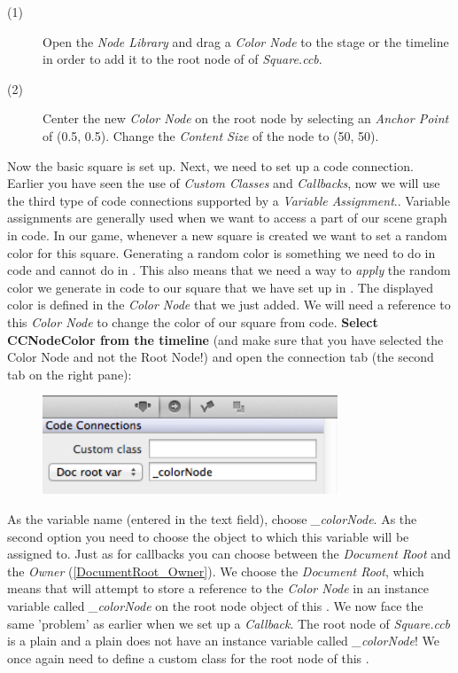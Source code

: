 \begin{description}
\item[(1)] Open the \textit{Node Library} and drag a \textit{Color Node} to the
stage or the timeline in order to add it to the root node of of
\textit{Square.ccb}.
\item[(2)] Center the new \textit{Color Node} on the root node by selecting an
\textit{Anchor Point} of (0.5, 0.5). Change the \textit{Content Size} of the
node to (50, 50).
\end{description}

Now the basic square is set up. Next, we need to set up a code connection. Earlier you have seen
the use of \textit{Custom Classes} and \textit{Callbacks}, now we will use the
third type of code connections supported by \SB{} a \textit{Variable
Assignment}.. Variable assignments
are generally used when we want to access a part of our scene graph in code. In
our game, whenever a new square is created we want to set a random color for
this square. Generating a random color is something we need to do in code and
cannot do in \SB{}. This also means that we need a way to \textit{apply} the random color we
generate in code to our square that we have set up in \SB{}. The displayed color
is defined in the \textit{Color Node} that we just added. We will need a
reference to this \textit{Color Node} to change the color of our square from
code. \textbf{Select CCNodeColor from the timeline} (and make sure that you
have selected the Color Node and not the Root Node!) and open the connection tab
(the second tab on the right pane):
\begin{figure}[H]
		\centering
		\includegraphics[width=250pt]{images/firstproject/square_code_connection.png}
\end{figure}
As the variable name (entered in the text field), choose \textit{\_colorNode}.
As the second option you need to choose the object to which this variable will be
assigned to. Just as for callbacks you can choose between the \textit{Document
Root} and the \textit{Owner} (\ref{DocumentRoot_Owner}). We choose the
\textit{Document Root}, which means that \SB{} will attempt to store a reference
to the \textit{Color Node} in an instance variable called \textit{\_colorNode}
 on the root node object of this \ccbfile{}. We now face the same 'problem' as earlier when we set up a
\textit{Callback}. The root node of \textit{Square.ccb} is a plain \ccnode{} and
a plain \ccnode{} does not have an instance variable called
\textit{\_colorNode}! We once again need to define a custom class for the root
node of this \ccbfile{}.

